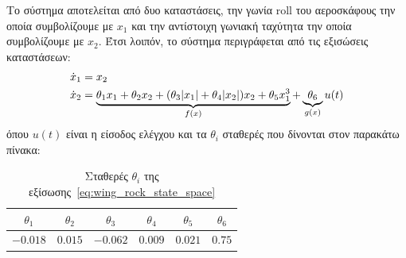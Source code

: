 Το σύστημα αποτελείται από δυο καταστάσεις, την γωνία roll του αεροσκάφους την οποία συμβολίζουμε με $x_1$ και την αντίστοιχη γωνιακή ταχύτητα την οποία συμβολίζουμε με $x_2$. Έτσι λοιπόν, το σύστημα περιγράφεται από τις εξισώσεις καταστάσεων:
\begin{equation}
\begin{split}
\dot{x}_1 &= x_2 \\
\dot{x}_2 &= 
\underbrace{\theta_1 x_1 + \theta_2 x_2 + (\theta_3 \abs{x_1} 
	+ \theta_4 \abs{x_2})x_2 + \theta_5 x_1^3}_{f(x)} 
+ \underbrace{\theta_6}_{g(x)} u(t)
\end{split}
\label{eq:wing_rock_state_space}
\end{equation}
όπου $u(t)$ είναι η είσοδος ελέγχου και τα $\theta_i$ σταθερές που δίνονται στον παρακάτω πίνακα:
\begin{table}[h]
	\begin{center}
		\begin{tabular}{ c | c | c | c | c | c}
			\hline
			\hline
			$\theta_1$ & $\theta_2$  & $\theta_3$ & $\theta_4$  & $\theta_5$ & $\theta_6$  \\   \hline 
			$-0.018$ & $0.015$  & $-0.062$ & $0.009$ & $0.021$ & $0.75$   \\
			\hline
			\hline
		\end{tabular}
		\caption{Σταθερές $\theta_i$ της εξίσωσης~\eqref{eq:wing_rock_state_space}}
		\label{tab:wing_rock_params}
	\end{center}
\end{table}


